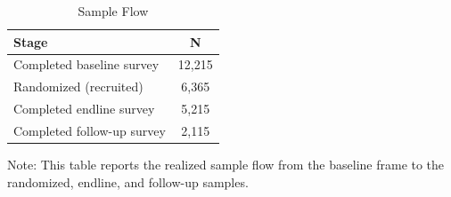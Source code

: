 \begin{table}[H]
\centering
\caption{Sample Flow}
\label{tab:sample_flow}
\footnotesize
\begin{threeparttable}
\begin{tabular}{lc}
\toprule
Stage & N \\
\midrule
Completed baseline survey & 12,215 \\
Randomized (recruited) & 6,365 \\
Completed endline survey & 5,215 \\
Completed follow-up survey & 2,115 \\
\bottomrule
\end{tabular}
\begin{tablenotes}[flushleft]
\footnotesize
\item Note: This table reports the realized sample flow from the baseline frame to the randomized, endline, and follow-up samples.
\end{tablenotes}
\end{threeparttable}
\end{table}
